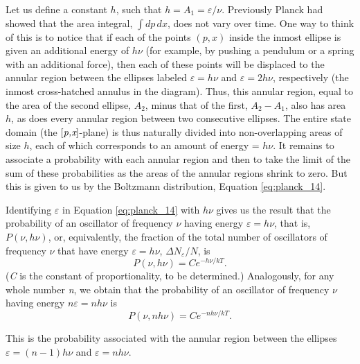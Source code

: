 %
Let us define a constant $h$, such that $h = A_1 = \varepsilon/\nu$. Previously Planck had showed that the area integral,
$\int\! dp\, dx$, does not vary over time. One way to think of this is to
notice that if each of the points $(p,x)$ inside the inmost ellipse
is given an additional energy of $h\nu$ (for example, by pushing a
pendulum or a spring with an additional force), then each of these
points will be displaced to the annular region between the ellipses
labeled $\varepsilon = h\nu$ and $\varepsilon = 2h\nu$, respectively (the inmost
cross-hatched annulus in the diagram). Thus, this annular region, equal
to the area of the second ellipse, $A_2$, minus that
of the first, $A_2 - A_1$,
also has area $h$, as does every annular region between two
consecutive ellipses. The entire state domain (the
${[}\emph{p,x}{]}$-plane) is thus naturally divided into non-overlapping
areas of size $h$, each of which corresponds to an amount of energy
= $h\nu$. It remains to associate a probability with each annular
region and then to take the limit of the sum of these probabilities as
the areas of the annular regions shrink to zero. But this is given to us
by the Boltzmann distribution, Equation \eqref{eq:planck_14}.

Identifying $\varepsilon$ in Equation \eqref{eq:planck_14} with $h\nu$ gives us the result
that the probability of an oscillator of frequency $\nu$ having
energy $\varepsilon = h\nu$, that is, $P(\nu, h\nu)$, or, equivalently, the
fraction of the total number of oscillators of frequency $\nu$ that
have energy $\varepsilon = h\nu$, $\Delta N_\varepsilon/N$,
is
%
\begin{equation*}
P(\nu, h\nu) = Ce^{-h\nu/kT}.
\end{equation*}
%
(\emph{C} is the constant of proportionality, to be determined.)
Analogously, for any whole number \emph{n}, we obtain that the
probability of an oscillator of frequency $\nu$ having energy
$n\varepsilon = nh\nu$ is
\begin{equation}
P(\nu, nh\nu) = Ce^{-nh\nu/kT}. %
\end{equation}

This is the probability associated with the annular region between the
ellipses $\varepsilon = (n-1)h\nu$ and $\varepsilon = nh\nu$.

